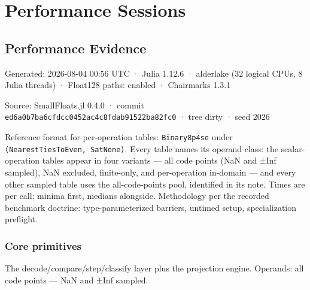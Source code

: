 \chapter{Performance Sessions}


\section{Performance Evidence}



\label{2936793895297684742}{}


Generated: 2026-08-04 00:56 UTC  ·  Julia 1.12.6  ·  alderlake (32 logical CPUs, 8 Julia threads)  ·  Float128 paths: enabled  ·  Chairmarks 1.3.1



Source: SmallFloats.jl 0.4.0  ·  commit \texttt{ed6a0b7ba6cfdcc0452ac4c8fdab91522ba82fc0}  ·  tree dirty  ·  seed 2026



Reference format for per-operation tables: \texttt{Binary8p4se} under \texttt{(\allowbreak{}NearestTiesToEven, SatNone)}. Every table names its operand class: the scalar-operation tables appear in four variants — all code points (NaN and ±Inf sampled), NaN excluded, finite-only, and per-operation in-domain — and every other sampled table uses the all-code-points pool, identified in its note. Times are per call; minima first, medians alongside. Methodology per the recorded benchmark doctrine: type-parameterized barriers, untimed setup, specialization preflight.



\subsection{Core primitives}



\label{10766655646123147915}{}


The decode/compare/step/classify layer plus the projection engine. Operands: all code points — NaN and ±Inf sampled.




